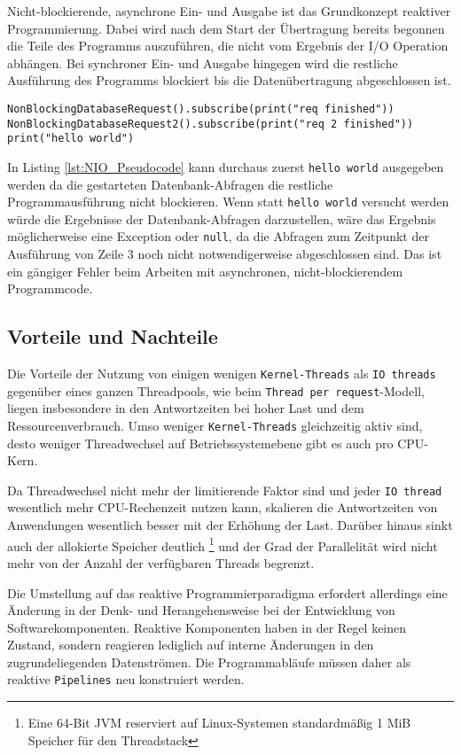 Nicht-blockierende, asynchrone Ein- und Ausgabe ist das Grundkonzept reaktiver Programmierung.
Dabei wird nach dem Start der Übertragung bereits begonnen die Teile des Programms auszuführen, die nicht vom Ergebnis der I/O Operation abhängen.
Bei synchroner Ein- und Ausgabe hingegen wird die restliche Ausführung des Programms blockiert
bis die Datenübertragung abgeschlossen ist.
\newpage
\begin{lstlisting}[caption=Pseudocode Non-blocking I/O (NIO), captionpos=b, label=lst:NIO_Pseudocode]
NonBlockingDatabaseRequest().subscribe(print("req finished"))
NonBlockingDatabaseRequest2().subscribe(print("req 2 finished"))
print("hello world")
\end{lstlisting}
In Listing \ref{lst:NIO_Pseudocode} kann durchaus zuerst \verb|hello world| ausgegeben werden da die gestarteten Datenbank-Abfragen die
restliche Programmausführung nicht blockieren. Wenn statt \verb|hello world| versucht werden würde die Ergebnisse der Datenbank-Abfragen
darzustellen, wäre das Ergebnis möglicherweise eine Exception oder \verb|null|, da die Abfragen zum Zeitpunkt der Ausführung von Zeile 3 noch nicht
notwendigerweise abgeschlossen sind. Das ist ein gängiger Fehler beim Arbeiten mit asynchronen, nicht-blockierendem Programmcode.

\subsection{Vorteile und Nachteile}
\label{subsec:vorteile_nachteile}
Die Vorteile der Nutzung von einigen wenigen \verb|Kernel-Threads| als \verb|IO threads| gegenüber eines ganzen Threadpools,
wie beim \verb|Thread per request|-Modell, liegen insbesondere in den Antwortzeiten bei
hoher Last und dem Ressourcenverbrauch.
Umso weniger \verb|Kernel-Threads| gleichzeitig aktiv sind, desto weniger Threadwechsel auf Betriebssystemebene
gibt es auch pro CPU-Kern.

Da Threadwechsel nicht mehr der limitierende Faktor sind und jeder \verb|IO thread| wesentlich mehr CPU-Rechenzeit nutzen kann,
skalieren die Antwortzeiten von Anwendungen wesentlich besser mit der Erhöhung der Last.
Darüber hinaus sinkt auch der allokierte Speicher deutlich
\footnote{Eine 64-Bit JVM reserviert auf Linux-Systemen standardmäßig 1 MiB Speicher für den Threadstack\parencite{OpenJDKGitHub}}
und der Grad der Parallelität wird nicht mehr von der Anzahl der verfügbaren Threads begrenzt.

Die Umstellung auf das reaktive Programmierparadigma erfordert allerdings eine Änderung in der Denk- und Herangehensweise bei der
Entwicklung von Softwarekomponenten. Reaktive Komponenten haben in der Regel keinen Zustand,
sondern reagieren lediglich auf interne Änderungen in den zugrundeliegenden Datenströmen.
Die Programmabläufe müssen daher als reaktive \verb|Pipelines| neu konstruiert werden.

